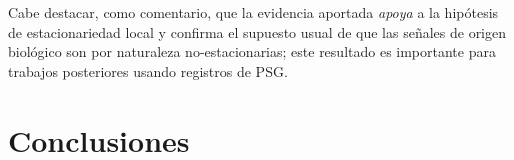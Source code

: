\documentclass[12pt,letterpaper]{book}
\begin{document}

Cabe destacar, como comentario, que la evidencia aportada \textit{apoya} a la hipótesis de estacionariedad local y confirma el supuesto usual de que las señales de origen biológico son por naturaleza no-estacionarias; este resultado es importante para trabajos posteriores usando registros de PSG.


%


\section{Conclusiones}
\end{document}
